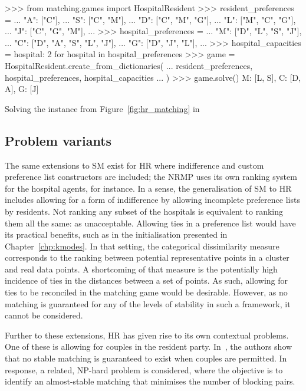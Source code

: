 \begin{listing}[htbp]
\begin{usagepy}
>>> from matching.games import HospitalResident
>>> resident_preferences = {
...     "A": ["C"],
...     "S": ["C", "M"],
...     "D": ["C", "M", "G"],
...     "L": ["M", "C", "G"],
...     "J": ["C", "G", "M"],
... }
>>> hospital_preferences = {
...     "M": ["D", "L", "S", "J"],
...     "C": ["D", "A", "S", "L", "J"],
...     "G": ["D", "J", "L"],
... }
>>> hospital_capacities = {hospital: 2 for hospital in hospital_preferences}
>>> game = HospitalResident.create_from_dictionaries(
...     resident_preferences, hospital_preferences, hospital_capacities
... )
>>> game.solve()
{M: [L, S], C: [D, A], G: [J]}

\end{usagepy}
\caption{Solving the instance from Figure~\ref{fig:hr_matching} in \matching}
\label{snp:hospital_resident}
\end{listing}

\subsection{Problem variants}

The same extensions to SM exist for HR where indifference and custom preference
list constructors are included; the NRMP uses its own ranking system for the
hospital agents, for instance. In a sense, the generalisation of SM to HR
includes allowing for a form of indifference by allowing incomplete preference
lists by residents. Not ranking any subset of the hospitals is equivalent to
ranking them all the same: as unacceptable. Allowing ties in a preference list
would have its practical benefits, such as in the initialisation presented in
Chapter~\ref{chp:kmodes}. In that setting, the categorical dissimilarity measure
corresponds to the ranking between potential representative points in a cluster
and real data points. A shortcoming of that measure is the potentially high
incidence of ties in the distances between a set of points. As such, allowing
for ties to be reconciled in the matching game would be desirable.  However, as
no matching is guaranteed for any of the levels of stability in such a
framework, it cannot be considered.

Further to these extensions, HR has given rise to its own contextual problems.
One of these is allowing for couples in the resident party.
In~\cite{Manlove2016}, the authors show that no stable matching is guaranteed to
exist when couples are permitted. In response, a related, NP-hard problem is
considered, where the objective is to identify an almost-stable matching
that minimises the number of blocking pairs.

